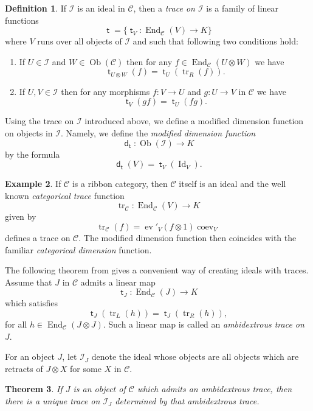 \documentclass[12pt, reqno]{amsart}
\newtheorem{theorem}{Theorem}[section]
\theoremstyle{definition}
\newtheorem{definition}[theorem]{Definition}
\newtheorem{example}[theorem]{Example}
\newcommand{\End}{\operatorname{End}}
\newcommand{\tr}{\text{tr}\,}
\newcommand{\ev}{\operatorname{ev}}
\newcommand{\coev}{\operatorname{coev}}
\renewcommand{\1}{_{(1)}}
\renewcommand{\2}{_{(2)}}
\newcommand{\3}{_{(3)}}
\newcommand{\4}{_{(4)}}
\newcommand{\cat}{\mathcal{C}}
\newcommand{\ideal}{\mathcal{I}}
\newcommand{\ob}{\operatorname{Ob}(\cat)}
\newcommand{\Id}{\operatorname{Id}}
\newcommand{\md}{\operatorname{\mathsf{d}}}
\newcommand{\mt}{\operatorname{\mathsf{t}}}
\renewcommand{\tr}{\operatorname{tr}}
\begin{document}
\begin{definition}\label{D:trace}  If $\ideal$ is an ideal in $\cat$, then a \emph{trace on $\ideal$} is a family of linear functions
$$\mt = \{\mt_V:\End_\cat(V)\rightarrow K\}$$
where $V$ runs over all objects of $\ideal$ and such that following two conditions hold:
\begin{enumerate}
\item  If $U\in \ideal$ and $W\in \ob$ then for any $f\in \End_\cat(U\otimes W)$ we have
\begin{equation}\label{E:VW}
\mt_{U\otimes W}\left(f \right)=\mt_U \left( \tr_R(f)\right).
\end{equation}
\item  If $U,V\in \ideal$ then for any morphisms $f:V\rightarrow U $ and $g:U\rightarrow V$  in $\cat$ we have 
\begin{equation}\label{E:fggf}
\mt_V(g f)=\mt_U(f  g).
\end{equation} 
\end{enumerate}
\end{definition}
Using the trace on $\ideal$ introduced above, we define a modified
dimension function on objects in $\ideal$.  Namely, we define the \emph{modified dimension function} 
\[
\md_{\mt}: \operatorname{Ob}(\ideal ) \to  K
\] by the formula 
\[
\md_{\mt} (V) = \mt_{V}\left(\Id_{V} \right).
\]



\begin{example}\label{X:categoricaltrace}
If $\cat$ is a ribbon category, then $\cat$ itself is an ideal and the well known \emph{categorical trace} function
\[
\tr_{\cat}: \End_{\cat}(V) \to  K
\] given by 
\[
\tr_{\cat}(f) = \ev'_{V}  (f \otimes 1)  \coev_{V}
\] defines a trace on $\cat$.  The modified dimension function then coincides with the familiar \emph{categorical dimension} function.
\end{example}

The following theorem from \cite{GKP} gives a convenient way of creating ideals with traces.  Assume that $J$ in $\cat$ admits a linear map 
\[
\mt_{J}: \End_{\cat}(J) \to K
\] which satisfies 
\begin{equation*}
\mt_{J}\left( \tr_{L}(h) \right) = \mt_{J} \left( \tr_{R}(h)\right),
\end{equation*} for all $h \in \End_{\cat}(J\otimes J)$. 
Such a linear map is called an \emph{ambidextrous trace on $J$}. 

For an object $J$, let $\ideal_{J}$ denote the ideal whose objects are all objects which are retracts of $J \otimes X$ for some $X$ in $\cat$.
\begin{theorem}\label{T:ambitrace} If $J$ is an object of $\cat$ which admits an
  ambidextrous trace, then there is a unique trace on $\ideal_{J}$ determined
  by that ambidextrous trace.
\end{theorem} 
\end{document}

